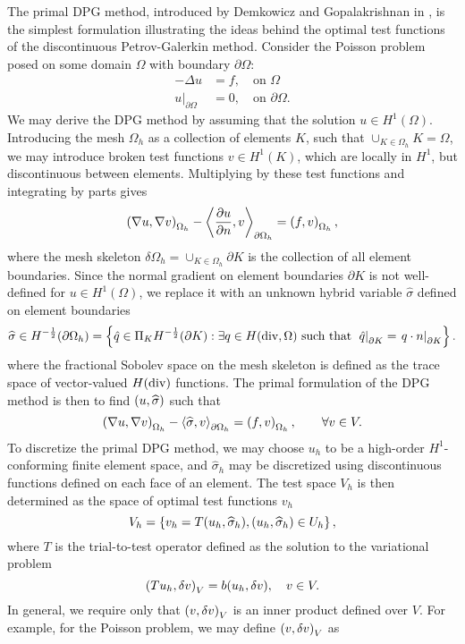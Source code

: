 The primal DPG method, introduced by Demkowicz and Gopalakrishnan in \cite{demkowicz2013primal}, is the simplest formulation illustrating the ideas behind the optimal test functions of the discontinuous Petrov-Galerkin method.  Consider the Poisson problem posed on some domain $\Omega$ with boundary $\partial \Omega$:
\begin{align*}
-\Delta u &=f, \quad \text{on } \Omega\\
\left.u\right|_{\partial \Omega} &=0, \quad \text{on } \partial \Omega.
\end{align*}
We may derive the DPG method by assuming that the solution $u \in H^1(\Omega)$.  Introducing the mesh $\Omega_h$ as a collection of elements $K$, such that $\cup_{K\in \Omega_h} K = \Omega$, we may introduce broken test functions $v \in H^1(K)$, which are locally in $H^1$, but discontinuous between elements.  Multiplying by these test functions and integrating by parts gives
\[
\left( \nabla u,\nabla v \right)_{\Omega_h} - \left< \frac{\partial u}{\partial n}{}, v \right>_{\partial \Omega_h} = \left( f,v \right)_{\Omega_h},
\]
where the mesh skeleton $\delta \Omega_h = \cup_{K\in \Omega_h} \partial K$ is the collection of all element boundaries.  Since the normal gradient on element boundaries $\partial K$ is not well-defined for $u \in H^1(\Omega)$, we replace it with an unknown hybrid variable $\widehat{\sigma}$ defined on element boundaries
\[
\widehat{\sigma} \in H^{-\frac{1}{2}}(\partial \Omega_h) = \left\{  \hat{q}\in \Pi_K H^{-\frac{1}{2}}(\partial K): \exists q \in H({\rm div}, \Omega) \text{ such that } \left.\hat{q}\right|_{\partial K} = \left.q\cdot n\right|_{\partial K} \right\}.
\]
where the fractional Sobolev space on the mesh skeleton is defined as the trace space of vector-valued $H({\rm div})$ functions.  The primal formulation of the DPG method is then to find $\left( u,\widehat{\sigma} \right)$ such that
\[
\left( \nabla u,\nabla v \right)_{\Omega_h} - \left< \widehat{\sigma}, v \right>_{\partial \Omega_h} = \left( f,v \right)_{\Omega_h}, \qquad \forall v \in V.
\]
To discretize the primal DPG method, we may choose $u_h$ to be a high-order $H^1$-conforming finite element space, and $\widehat{\sigma}_h$ may be discretized using discontinuous functions defined on each face of an element.  The test space $V_h$ is then determined as the space of optimal test functions $v_h$
\[
V_h = \left\{  v_h = T (u_h, \widehat{\sigma}_h), (u_h, \widehat{\sigma}_h) \in U_h \right\}, 
\]
where $T$ is the trial-to-test operator defined as the solution to the variational problem
\[
\left( Tu_h, \delta v \right)_V = b(u_h,\delta v), \quad v\in V.
\]
In general, we require only that $\left( v,\delta v \right)_V$ is an inner product defined over $V$.  For example, for the Poisson problem, we may define $\left( v,\delta v \right)_V$ as
